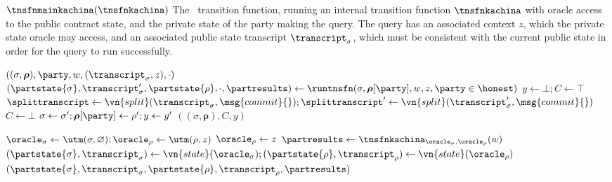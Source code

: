\begin{transitionfn}{$\tnsfnmainkachina(\tnsfnkachina)$}
  The \kachina\ transition function, running an internal transition
  function $\tnsfnkachina$ with oracle access to the public contract state, and the
  private state of the party making the query. The query has an associated
  context $z$, which the private state oracle may access, and an associated
  public state transcript $\transcript_\sigma$, which must be consistent with
  the current public state in order for the query to run successfully.

  \vsep
  
  \begin{receiveinput*}{$((\sigma, \boldsymbol\rho), \party, w,
      (\transcript_\sigma, z), \cdot)$}
    \State \Let $(\partstate{\sigma}, \transcript_\sigma', \partstate{\rho}, \cdot, \partresults) \gets
      \runtnsfn(\sigma, \boldsymbol\rho[\party], w, z, \party \in \honest)$
    \State \Let $y \gets \bot; C \gets \top$
    \State \Let $\splittranscript \gets
      \vn{split}(\transcript_\sigma, \msg{commit}{}); \splittranscript' \gets
      \vn{split}(\transcript_\sigma', \msg{commit}{})$
        \State \Let $C \gets \bot$
        \State \Break
      \EndIf
      \State \Let $\sigma \gets \sigma'; \boldsymbol\rho[\party] \gets \rho'; y
        \gets y'$
    \EndFor
    \State \Return $((\sigma, \boldsymbol\rho), C, y)$
  \end{receiveinput*}

  \begin{helpers}
      \State $\oracle_\sigma \gets \utm(\sigma, \varnothing); \oracle_\rho \gets
        \utm(\rho, z)$
        \Let $\oracle_\rho \gets z$
      \EndIf
      \State $\partresults \gets \tnsfnkachina_{\oracle_\sigma,\oracle_\rho}(w)$
      \State $(\partstate{\sigma}, \transcript_\sigma) \gets \vn{state}(\oracle_\sigma);
      (\partstate{\rho}, \transcript_\rho) \gets \vn{state}(\oracle_\rho)$
      \State \Return $(\partstate{\sigma}, \transcript_\sigma, \partstate{\rho}, \transcript_\rho, \partresults)$
    \EndFunction
  \end{helpers}
\end{transitionfn}
